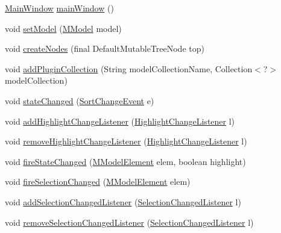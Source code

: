 \begin{DoxyCompactItemize}
\item 
\hyperlink{classorg_1_1tzi_1_1use_1_1gui_1_1main_1_1_main_window}{Main\-Window} \hyperlink{classorg_1_1tzi_1_1use_1_1gui_1_1main_1_1_model_browser_ab3dc880431e69b4ae3e22c817df84084}{main\-Window} ()
\item 
void \hyperlink{classorg_1_1tzi_1_1use_1_1gui_1_1main_1_1_model_browser_a836fed677671f7b9688e98b698f3485b}{set\-Model} (\hyperlink{classorg_1_1tzi_1_1use_1_1uml_1_1mm_1_1_m_model}{M\-Model} model)
\item 
void \hyperlink{classorg_1_1tzi_1_1use_1_1gui_1_1main_1_1_model_browser_a96a778d9f152d2b96c6e2233c34e7f28}{create\-Nodes} (final Default\-Mutable\-Tree\-Node top)
\item 
void \hyperlink{classorg_1_1tzi_1_1use_1_1gui_1_1main_1_1_model_browser_a01aa367394dde23c6c469f92be1a7662}{add\-Plugin\-Collection} (String model\-Collection\-Name, Collection$<$?$>$ model\-Collection)
\item 
void \hyperlink{classorg_1_1tzi_1_1use_1_1gui_1_1main_1_1_model_browser_a713bf26da6dd1653ba74539535a3cf0b}{state\-Changed} (\hyperlink{classorg_1_1tzi_1_1use_1_1gui_1_1main_1_1_model_browser_sorting_1_1_sort_change_event}{Sort\-Change\-Event} e)
\item 
void \hyperlink{classorg_1_1tzi_1_1use_1_1gui_1_1main_1_1_model_browser_a5d2dd816cf2517ec997e51f5f585959c}{add\-Highlight\-Change\-Listener} (\hyperlink{interfaceorg_1_1tzi_1_1use_1_1gui_1_1views_1_1diagrams_1_1event_1_1_highlight_change_listener}{Highlight\-Change\-Listener} l)
\item 
void \hyperlink{classorg_1_1tzi_1_1use_1_1gui_1_1main_1_1_model_browser_a5c5c252837eff567d6514f7dd2b82cc5}{remove\-Highlight\-Change\-Listener} (\hyperlink{interfaceorg_1_1tzi_1_1use_1_1gui_1_1views_1_1diagrams_1_1event_1_1_highlight_change_listener}{Highlight\-Change\-Listener} l)
\item 
void \hyperlink{classorg_1_1tzi_1_1use_1_1gui_1_1main_1_1_model_browser_a6abf62677b99570da62ffb29f5ed0971}{fire\-State\-Changed} (\hyperlink{interfaceorg_1_1tzi_1_1use_1_1uml_1_1mm_1_1_m_model_element}{M\-Model\-Element} elem, boolean highlight)
\item 
void \hyperlink{classorg_1_1tzi_1_1use_1_1gui_1_1main_1_1_model_browser_a4bbfed56c33839eda8039acc57ef8a05}{fire\-Selection\-Changed} (\hyperlink{interfaceorg_1_1tzi_1_1use_1_1uml_1_1mm_1_1_m_model_element}{M\-Model\-Element} elem)
\item 
void \hyperlink{classorg_1_1tzi_1_1use_1_1gui_1_1main_1_1_model_browser_a07ad2cc267d7cfb8b84613832fdcb6f9}{add\-Selection\-Changed\-Listener} (\hyperlink{interfaceorg_1_1tzi_1_1use_1_1gui_1_1main_1_1_model_browser_1_1_selection_changed_listener}{Selection\-Changed\-Listener} l)
\item 
void \hyperlink{classorg_1_1tzi_1_1use_1_1gui_1_1main_1_1_model_browser_a9081c5d58ef55065c53c81f004a2dcc7}{remove\-Selection\-Changed\-Listener} (\hyperlink{interfaceorg_1_1tzi_1_1use_1_1gui_1_1main_1_1_model_browser_1_1_selection_changed_listener}{Selection\-Changed\-Listener} l)
\end{DoxyCompactItemize}


